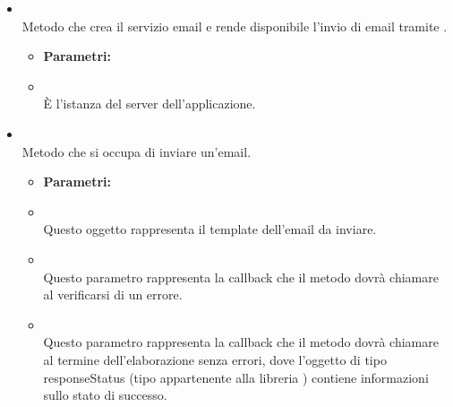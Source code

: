 \begin{itemize}
\item[] \textbf{} \\ Metodo che crea il servizio email e rende disponibile l'invio di email tramite .
\begin{itemize}\addtolength{\itemsep}{-0.5\baselineskip}
\item[] \textbf{Parametri:}
\item[]  \\ È l'istanza del server dell'applicazione.
\end{itemize}
\item[] \textbf{} \\ Metodo che si occupa di inviare un'email.
\begin{itemize}\addtolength{\itemsep}{-0.5\baselineskip}
\item[] \textbf{Parametri:}
\item[]  \\ Questo oggetto rappresenta il template dell'email da inviare.
\item[]  \\ Questo parametro rappresenta la callback che il metodo dovrà chiamare al verificarsi di un errore.
\item[]  \\ Questo parametro rappresenta la callback che il metodo dovrà chiamare al termine dell'elaborazione senza errori, dove l'oggetto di tipo responseStatus (tipo appartenente alla libreria ) contiene informazioni sullo stato di successo.
\end{itemize}
\end{itemize}

